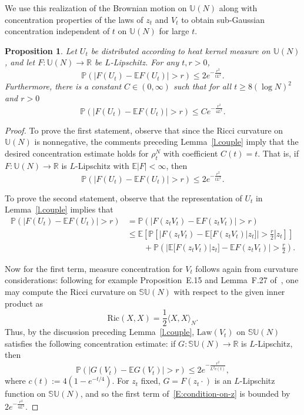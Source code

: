 \documentclass[11pt]{article}
\newtheorem{prop}[theo]{Proposition}
\theoremstyle{definition}
\numberwithin{equation}{section}
\numberwithin{figure}{section}
\numberwithin{table}{section}
\newcommand{\Unitary}[1]{\mathbb{U}\left(#1\right)}
\newcommand{\SUnitary}[1]{\mathbb{SU}\left(#1\right)}
\newcommand{\R}{\mathbb{R}}
\newcommand{\E}{\mathbb{E}}
\newcommand{\Prob}{\mathbb{P}}
\begin{document}
We use this realization of the Brownian motion on $\mathbb{U}(N)$ along with concentration properties of the laws of $z_t$ and $V_t$ to obtain sub-Gaussian concentration independent of $t$ on $\Unitary{N}$ for large $t$.

\begin{prop}\label{T:BM-U(N)-concentration}
Let $U_t$ be distributed according to heat kernel measure on $\Unitary{N}$, and let $F:\Unitary{N}\to\R$ be $L$-Lipschitz. For any $t,r>0$,
\[
\Prob(|F(U_t)-\E F(U_t)|>r)\le 2e^{-\frac{r^2}{tL^2}}.
\]
Furthermore, there is a constant $C\in(0,\infty)$ such that for all $t\ge8(\log N)^2$ and $r>0$
\[
\Prob\left(|F(U_t)-\E F(U_t)|>r\right)\le C e^{-\frac{r^2}{4L^2}}.
\]
\end{prop}

\begin{proof}
To prove the first statement, observe that since the Ricci curvature on $\Unitary{N}$ is nonnegative, the comments preceding Lemma~\ref{l.couple} imply that the desired concentration estimate holds for $\rho_t^N$ with coefficient $C(t)=t$. That is, if $F:\Unitary{N}\to\R$ is $L$-Lipschitz with $\mathbb{E}|F|<\infty$, then
\[
\Prob(|F(U_t)-\E F(U_t)|>r)\le 2e^{-\frac{r^2}{tL^2}}.
\]

To prove the second statement, observe that the representation of $U_t$ in Lemma~\ref{l.couple} implies that
\begin{equation}
\begin{split}\label{E:condition-on-z}
\Prob\left(|F(U_t)-\E F(U_t)|>r\right) &=\Prob\left(|F(z_tV_t)-\E F(z_tV_t)|>r\right)\\
&\le\E\left[\Prob\left[\left.\Big|F(z_tV_t)-\E\big[F(z_tV_t)\big|z_t\big]\Big|>\frac{r}{2}\right|z_t\right]\right] \\
&\qquad +\Prob\left(\left|\E\big[F(z_tV_t)\big|z_t\big]-\E F(z_tV_t)\right|>\frac{r}{2}\right).
\end{split}
\end{equation}

Now for the first term, measure concentration for $V_t$ follows again from curvature considerations: following for example Proposition~E.15 and Lemma~F.27 of~\cite{AGZ}, one may compute the Ricci curvature on $\SUnitary{N}$ with respect to the given inner product as
\[
\mathrm{Ric}(X,X) = \frac{1}{2}\langle X,X\rangle_N.
\]
Thus, by the discussion preceding Lemma~\ref{l.couple}, $\mathrm{Law}(V_t)$ on $\SUnitary{N}$ satisfies the following concentration estimate: if $G:\SUnitary{N}\to\R$ is $L$-Lipschitz, then
\[
\Prob(|G(V_t)-\E G(V_t)|>r)\le 2e^{-\frac{r^2}{L^2c(t)}},
\]
where $c(t):=4(1-e^{-t/4})$. For $z_t$ fixed, $G=F(z_t\cdot)$ is an $L$-Lipschitz function on $\SUnitary{N}$, and so the first term of~\eqref{E:condition-on-z} is bounded by $2e^{-\frac{r^2}{4L^2}}$.


\end{proof}
\end{document}
